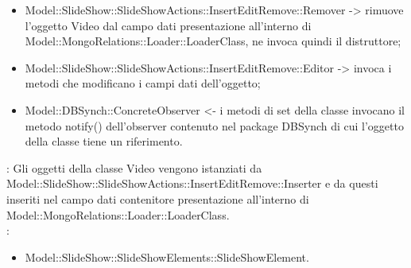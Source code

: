 {{\begin{itemize}
                    \item Model::\-SlideShow::\-SlideShowActions::\-InsertEditRemove::\-Remover -> rimuove l’oggetto Video dal campo dati presentazione all’interno di Model::\-MongoRelations::\-Loader::\-LoaderClass, ne invoca quindi il distruttore;
                     \item Model::\-SlideShow::\-SlideShowActions::\-InsertEditRemove::\-Editor -> invoca i metodi che modificano i campi dati dell'oggetto;
                    \item Model::\-DBSynch::\-ConcreteObserver <- i metodi di set della classe invocano il metodo notify() dell'observer contenuto nel package DBSynch di cui l'oggetto della classe tiene un riferimento.
				\end{itemize}	
                \textbf{\interfacce}: Gli oggetti della classe Video vengono istanziati da Model::\-SlideShow::\-SlideShowActions::\-InsertEditRemove::\-Inserter e da questi inseriti nel campo dati contenitore presentazione all’interno di \\Model::\-MongoRelations::\-Loader::\-LoaderClass.\\
                \textbf{\base}: 
                    \begin{itemize}
                    \item Model::\-SlideShow::\-SlideShowElements::\-SlideShowElement.
                    \end{itemize}
                    }     
}
